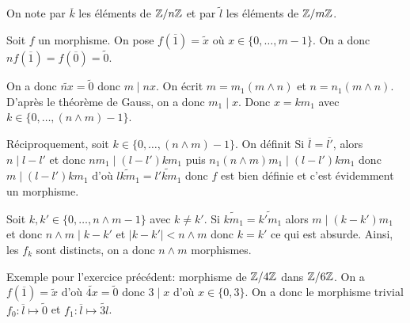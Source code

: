 \begin{solution}
	On note par $\overline{k}$ les éléments de $\mathbb{Z}/n\mathbb{Z}$ et par $\widetilde{l}$ les éléments de $\mathbb{Z}/m\mathbb{Z}$.

	Soit $f$ un morphisme. On pose $f(\overline{1})=\widetilde{x}$ où $x\in\{0,\dots,m-1\}$. On a donc $nf(\overline{1})=f(\overline{0})=\widetilde{0}$.

	On a donc $\widetilde{nx}=\widetilde{0}$ donc $m\mid nx$. On écrit $m=m_{1}(m\wedge n)$ et $n=n_{1}(m\wedge n)$. D'après le théorème de Gauss, on a donc $m_{1}\mid x$. Donc $x=km_{1}$ avec $k\in\{0,\dots,(n\wedge m)-1\}$.

	Réciproquement, soit $k\in\{0,\dots,(n\wedge m)-1\}$. On définit 
	Si $\overline{l}=\overline{l'}$, alors $n\mid l-l'$ et donc $nm_{1}\mid (l-l')km_{1}$ puis $n_{1}(n\wedge m)m_{1}\mid (l-l')km_{1}$ donc $m\mid (l-l')km_{1}$ d'où $\widetilde{lkm_{1}}=\widetilde{l'km_{1}}$ donc $f$ est bien définie et c'est évidemment un morphisme. 
	
	Soit $k,k'\in\{0,\dots,n\wedge m-1\}$ avec $k\neq k'$. Si $\widetilde{km_{1}}=\widetilde{k'm_{1}}$ alors $m\mid (k-k')m_{1}$ et donc $n\wedge m\mid k-k'$ et $\vert k-k'\vert< n\wedge m$ donc $k=k'$ ce qui est absurde. Ainsi, les $f_{k}$ sont distincts, on a donc $n\wedge m$ morphismes.
\end{solution}

\begin{remark}
	Exemple pour l'exercice précédent: morphisme de $\mathbb{Z}/4\mathbb{Z}$ dans $\mathbb{Z}/6\mathbb{Z}$. On a $f(\overline{1})=\widetilde{x}$ d'où $\widetilde{4x}=\widetilde{0}$ donc $3\mid x$ d'où $x\in\{0,3\}$. On a donc le morphisme trivial $f_{0}\colon \overline{l}\mapsto\widetilde{0}$ et $f_{1}\colon\overline{l}\mapsto\widetilde{3l}$.
\end{remark}

